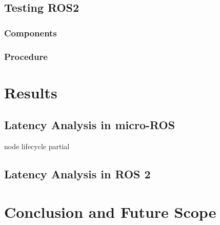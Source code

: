 \documentclass[%
xelatex,
	oneside,		%
	12pt,			%
	parskip=half,	%
	abstracton,
	chapterprefix=true%
    appendixprefix=true]
{scrbook}
\begin{document}
	\section{Testing ROS2}
	\subsection{Components}
	\subsection{Procedure}	


		\chapter{Results}
			
\rofoot[\pagemark]{\pagemark}
		\section{Latency Analysis in micro-ROS}
		node lifecycle partial
		\section{Latency Analysis in ROS 2}
		
		
		\chapter{Conclusion and Future Scope}
			
\rofoot[\pagemark]{\pagemark}
	\listoffigures
	\listoftables
		
		

\end{document}
